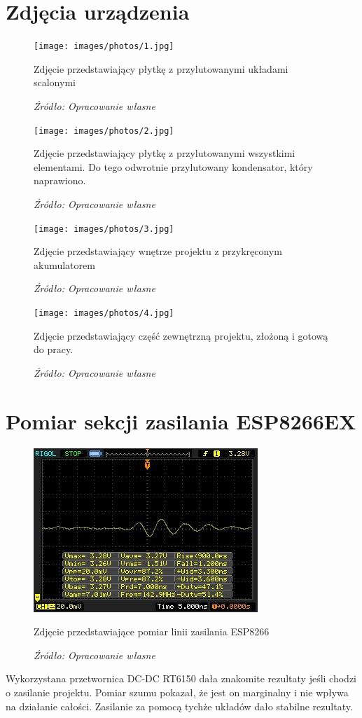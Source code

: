 \documentclass[12pt,a4paper,oneside]{memoir}
\begin{document}
\section{Zdjęcia urządzenia}
\begin{figure} [!h]
	\centering
	\texttt{[image: images/photos/1.jpg]}
	{\tytulyrozdzialow \footnotesize \caption[Zdjęcie - układy scalone] {Zdjęcie przedstawiający płytkę z przylutowanymi układami scalonymi}}
	\caption*{\textit{Źródło: Opracowanie własne}}
\end{figure}
\begin{figure} [!h]
	\centering
	\texttt{[image: images/photos/2.jpg]}
	{\tytulyrozdzialow \footnotesize \caption[Zdjęcie - ukończona płytka] {Zdjęcie przedstawiający płytkę z przylutowanymi wszystkimi elementami. Do tego odwrotnie przylutowany kondensator, który naprawiono.}}
	\caption*{\textit{Źródło: Opracowanie własne}}
\end{figure}
\begin{figure} [!h]
	\centering
	\texttt{[image: images/photos/3.jpg]}
	{\tytulyrozdzialow \footnotesize \caption[Zdjęcie - wnętrze projektu] {Zdjęcie przedstawiający wnętrze projektu z przykręconym akumulatorem}}
	\caption*{\textit{Źródło: Opracowanie własne}}
\end{figure}
\begin{figure} [!h]
	\centering
	\texttt{[image: images/photos/4.jpg]}
	{\tytulyrozdzialow \footnotesize \caption[Zdjęcie - wygląd projektu] {Zdjęcie przedstawiający część zewnętrzną projektu, złożoną i gotową do pracy.}}
	\caption*{\textit{Źródło: Opracowanie własne}}
\end{figure}
\section{Pomiar sekcji zasilania ESP8266EX}
\begin{figure} [!h]
	\centering
	\includegraphics[scale=1]{images/photos/5.jpg}
	{\tytulyrozdzialow \footnotesize \caption[Pomiar - zasilanie ESP8266] {Zdjęcie przedstawiające pomiar linii zasilania ESP8266}}
	\caption*{\textit{Źródło: Opracowanie własne}}
\end{figure}
\par Wykorzystana przetwornica DC-DC RT6150 dała znakomite rezultaty jeśli chodzi o zasilanie projektu. Pomiar szumu pokazał, że jest on marginalny i nie wpływa na działanie całości. Zasilanie za pomocą tychże układów dało stabilne rezultaty.
\newpage
\end{document}
